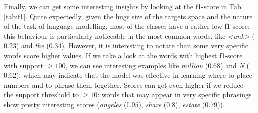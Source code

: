 Finally, we can get some interesting insights by looking at the f1-score in Tab.\ref{tab:f1}. Quite expectedly, given the huge size of the targets space and the nature of the task of language modelling, most of the classes have a rather low f1-score; this behaviour is particularly noticeable in the most common words, like \emph{<unk>} ($0.23$) and \emph{the} ($0.34$). However, it is interesting to notate than some very specific words score higher values. If we take a look at the words with highest f1-score with support $\ge 100$, we can see interesting examples like \emph{million} ($0.68$) and \emph{N} ($0.62$), which may indicate that the model was effective in learning where to place numbers and to phrase them together. Scores can get even higher if we reduce the support threshold to $\ge 10$: words that may appear in very specific phrasings show pretty interesting scores (\emph{angeles} ($0.95$), \emph{share} ($0.8$), \emph{estate} ($0.79$)).

\begin{table}
    \centering
    
    \caption{.}
    \label{tab:f1}
\end{table}
